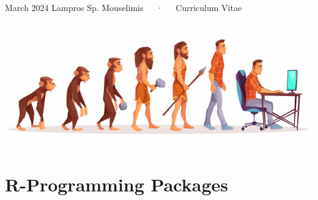 \documentclass[11pt, a4paper]{awesome-cv}
\begin{document}
\makecvheader

\makecvfooter
  {March 2024}
    {Lampros Sp. Mouselimis~~~·~~~Curriculum Vitae}
  {\thepage}





\includegraphics{human_evolution.jpg}

\hypertarget{r-programming-packages}{%
\section{R-Programming Packages}\label{r-programming-packages}}
\end{document}
